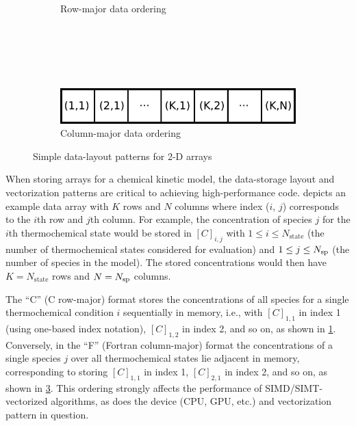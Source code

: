 \documentclass[12pt,number,sort&compress,preprint]{elsarticle}
\begin{document}
\begin{figure}[htb]
\begin{minipage}{0.45\linewidth}
\begin{subfigure}[t]{\textwidth}
	\caption{Row-major data ordering}
	\label{F:row_major}
    \end{subfigure}
    \\
    \\
    \\
    \\
    \begin{subfigure}[t]{\textwidth}
	\includegraphics[width=\textwidth]{column_major.pdf}
	\caption{Column-major data ordering}
	\label{F:column_major}
    \end{subfigure}
  \end{minipage}
  \caption{Simple data-layout patterns for 2-D arrays}
\end{figure}

When storing arrays for a chemical kinetic model, the data-storage layout and vectorization patterns are critical to achieving high-performance code.
 depicts an example data array with $K$ rows and $N$ columns where index ($i$, $j$) corresponds to the $i$th row and $j$th column.
For example, the concentration of species $j$ for the $i$th thermochemical state would be stored in $[C]_{i, j}$ with $1 \le i \le N_{\text{state}}$ (the number of thermochemical states considered for evaluation) and $1 \le j \le \ns/$ (the number of species in the model).
The stored concentrations would then have $K = N_{\text{state}}$ rows and $N = \ns/$ columns.

The ``C'' (C row-major) format stores the concentrations of all species for a single thermochemical condition $i$  sequentially in memory, i.e., with  $[C]_{1, 1}$ in index 1 (using one-based index notation), $[C]_{1, 2}$ in index 2, and so on, as shown in \cref{F:row_major}.
Conversely, in the ``F'' (Fortran column-major) format the concentrations of a single species $j$ over all thermochemical states lie adjacent in memory, corresponding to storing $[C]_{1, 1}$ in index 1, $[C]_{2, 1}$ in index 2, and so on, as shown in \cref{F:column_major}.
This ordering strongly affects the performance of SIMD\slash SIMT-vectorized algorithms, as does the device (CPU, GPU, etc.\@) and vectorization pattern in question.
\end{document}

